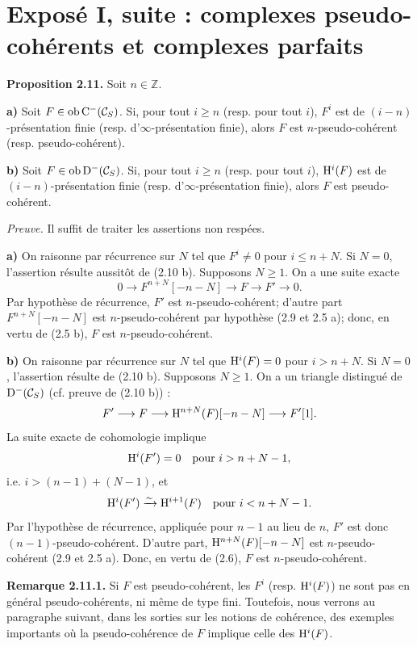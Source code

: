 \documentclass[11pt]{article}
\begin{document}
\section*{Exposé I, suite : complexes pseudo-cohérents et complexes parfaits}

\textbf{Proposition 2.11.} Soit \(n\in\mathbb Z\).

\textbf{a)} Soit \(F\in\operatorname{ob}\mathrm C^-(\mathcal C_S)\). Si, pour tout \(i\geq n\) (resp. pour tout \(i\)), \(F^i\) est de \((i-n)\)-présentation finie (resp. d'\(\infty\)-présentation finie), alors \(F\) est \(n\)-pseudo-cohérent (resp. pseudo-cohérent).

\textbf{b)} Soit \(F\in\operatorname{ob}\mathrm D^-(\mathcal C_S)\). Si, pour tout \(i\geq n\) (resp. pour tout \(i\)), \(\mathrm H^i(F)\) est de \((i-n)\)-présentation finie (resp. d'\(\infty\)-présentation finie), alors \(F\) est pseudo-cohérent.

\emph{Preuve.} Il suffit de traiter les assertions non respées.

\textbf{a)} On raisonne par récurrence sur \(N\) tel que \(F^i\neq0\) pour \(i\leq n+N\). Si \(N=0\), l'assertion résulte aussitôt de (2.10 b). Supposons \(N\geq1\). On a une suite exacte
\[
  0\longrightarrow F^{n+N}[-n-N]\longrightarrow F\longrightarrow F'\longrightarrow 0 .
\]
Par hypothèse de récurrence, \(F'\) est \(n\)-pseudo-cohérent; d'autre part \(F^{n+N}[-n-N]\) est \(n\)-pseudo-cohérent par hypothèse (2.9 et 2.5 a); donc, en vertu de (2.5 b), \(F\) est \(n\)-pseudo-cohérent.

\textbf{b)} On raisonne par récurrence sur \(N\) tel que \(\mathrm H^i(F)=0\) pour \(i>n+N\). Si \(N=0\), l'assertion résulte de (2.10 b). Supposons \(N\geq1\). On a un triangle distingué de \(\mathrm D^-(\mathcal C_S)\) (cf. preuve de (2.10 b)) :
\[
  F'\longrightarrow F\longrightarrow \mathrm H^{n+N}(F)[-n-N]\longrightarrow F'[1].
\]
La suite exacte de cohomologie implique
\[
  \mathrm H^i(F')=0\quad\text{pour }i>n+N-1,
\]
i.e. \(i>(n-1)+(N-1)\), et
\[
  \mathrm H^i(F')\xrightarrow{\sim}\mathrm H^{i+1}(F)\quad\text{pour }i<n+N-1 .
\]
Par l'hypothèse de récurrence, appliquée pour \(n-1\) au lieu de \(n\), \(F'\) est donc \((n-1)\)-pseudo-cohérent. D'autre part, \(\mathrm H^{n+N}(F)[-n-N]\) est \(n\)-pseudo-cohérent (2.9 et 2.5 a). Donc, en vertu de (2.6), \(F\) est \(n\)-pseudo-cohérent.

\textbf{Remarque 2.11.1.} Si \(F\) est pseudo-cohérent, les \(F^i\) (resp. \(\mathrm H^i(F)\)) ne sont pas en général pseudo-cohérents, ni même de type fini. Toutefois, nous verrons au paragraphe suivant, dans les sorties sur les notions de cohérence, des exemples importants où la pseudo-cohérence de \(F\) implique celle des \(\mathrm H^i(F)\).
\end{document}
